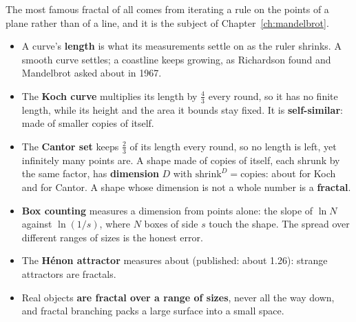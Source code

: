 The most famous fractal of all comes from iterating a rule on the points of
a plane rather than of a line, and it is the subject of
Chapter~\ref{ch:mandelbrot}.

\begin{summarybox}
\begin{itemize}
\item A curve's \textbf{length} is what its measurements settle on as the
  ruler shrinks. A smooth curve settles; a coastline keeps growing, as
  Richardson found and Mandelbrot asked about in 1967.
\item The \textbf{Koch curve} multiplies its length by $\tfrac{4}{3}$ every
  round, so it has no finite length, while its height and the area it bounds
  stay fixed. It is \textbf{self-similar}: made of smaller copies of itself.
\item The \textbf{Cantor set} keeps $\tfrac{2}{3}$ of its length every round,
  so no length is left, yet infinitely many points are. A shape made of
  copies of itself, each shrunk by the same factor, has \textbf{dimension}
  $D$ with $\text{shrink}^{D} = \text{copies}$: about
   for Koch and  for Cantor. A
  shape whose dimension is not a whole number is a \textbf{fractal}.
\item \textbf{Box counting} measures a dimension from points alone: the
  slope of $\ln N$ against $\ln(1/s)$, where $N$ boxes of side $s$ touch the
  shape. The spread over different ranges of sizes is the honest error.
\item The \textbf{Hénon attractor} measures about 
  (published: about \num{1.26}): strange attractors are fractals.
\item Real objects \textbf{are fractal over a range of sizes}, never all the
  way down, and fractal branching packs a large surface into a small space.
\end{itemize}
\end{summarybox}

\canyou

